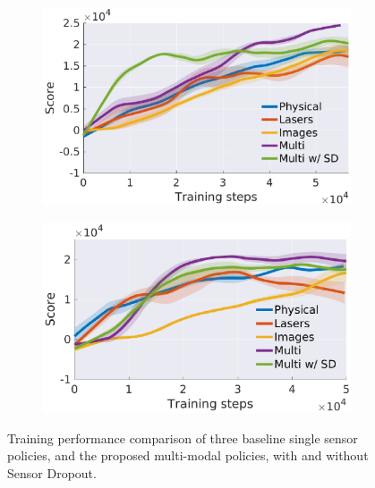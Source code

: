 \documentclass[../thesis.tex]{subfiles}
\begin{document}
\begin{figure}[t]
    \centering
    \begin{subfigure}[b]{0.48\linewidth}
        \includegraphics[width=\columnwidth]{./MultimodalDRL/fig/training_step_naf_without_aux}
        \label{fig:training_exp_naf}
    \end{subfigure}
    \begin{subfigure}[b]{0.48\linewidth}
        \includegraphics[width=\columnwidth]{./MultimodalDRL/fig/training_step_ddpg_without_aux}
        \label{fig:training_exp_ddpg}
    \end{subfigure}
    \caption{Training performance comparison of three baseline single sensor policies, and the proposed multi-modal policies, with and without Sensor Dropout.}
    \label{fig:training_exp}
\end{figure}
\end{document}
